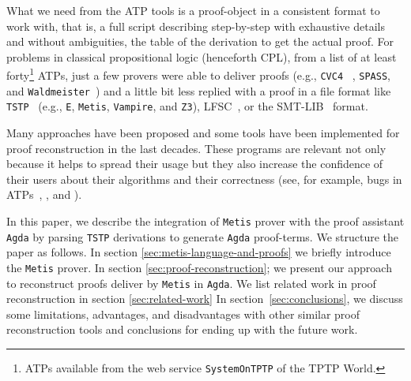 \documentclass[main.tex]{subfiles}
\begin{document}
What we need from the ATP tools is a proof-object in a consistent format
to work with, that is, a full script describing step-by-step with
exhaustive details and without ambiguities, the table of the derivation
to get the actual proof. For problems in classical propositional logic
(henceforth CPL), from a list of at least forty\footnote{ATPs available
from the web service \texttt{SystemOnTPTP} of the TPTP World.} ATPs, just
a few provers were able to deliver proofs (e.g., \verb!CVC4!~
\cite{Barrett2011}, \verb!SPASS!, and
\verb!Waldmeister!~\cite{hillenbrand1997})
and a little bit less replied with a proof in a
file format like \verb!TSTP!~\cite{sutcliffe2004tstp} (e.g., \verb!E!, \verb!Metis!,
\verb!Vampire!, and \verb!Z3!), LFSC~\cite{Stump2008}, or the
SMT-LIB~\cite{Bohme2011} format.

Many approaches have been proposed and some tools have been implemented
for proof reconstruction in the last decades. These programs are relevant
not only because it helps to spread their usage but they also increase
the confidence of their users about their algorithms and their
correctness (see, for example, bugs in ATPs~\cite{Keller2013},
\cite{Bohme2011}, \cite{Fleury2014} and \cite{Kanso2012}).

In this paper, we describe the integration of \verb!Metis! prover with the
proof assistant \verb!Agda! by parsing \verb!TSTP! derivations to generate
\verb!Agda! proof-terms. We structure the paper as follows.
In section \ref{sec:metis-language-and-proofs} we briefly introduce
the \verb!Metis! prover. In section \ref{sec:proof-reconstruction}; we
present our approach to reconstruct proofs deliver by \verb!Metis! in
\verb!Agda!.
We list related work in proof reconstruction in section \ref{sec:related-work}
In section~\ref{sec:conclusions}, we discuss some limitations, advantages,
and disadvantages with other similar proof reconstruction tools and
conclusions for ending up with the future work.
\end{document}
